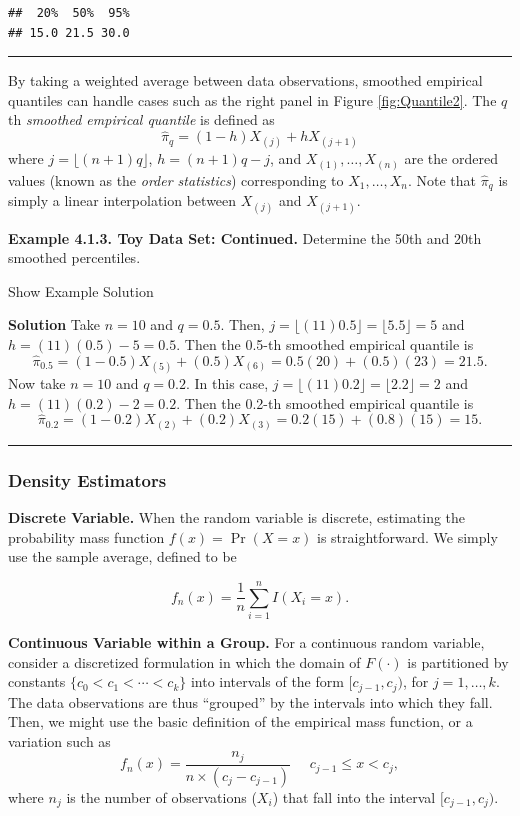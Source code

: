 \documentclass[]{book}
\theoremstyle{definition}
\theoremstyle{definition}
\theoremstyle{definition}
\theoremstyle{remark}
\begin{document}
\begin{verbatim}
##  20%  50%  95% 
## 15.0 21.5 30.0
\end{verbatim}

\begin{center}\rule{0.5\linewidth}{\linethickness}\end{center}

By taking a weighted average between data observations, smoothed
empirical quantiles can handle cases such as the right panel in Figure
\ref{fig:Quantile2}. The \(q\)th \emph{smoothed empirical quantile} is
defined as \[
\hat{\pi}_q = (1-h) X_{(j)} + h X_{(j+1)}
\] where \(j=\lfloor(n+1)q\rfloor\), \(h=(n+1)q-j\), and
\(X_{(1)}, \ldots, X_{(n)}\) are the ordered values (known as the
\emph{order statistics}) corresponding to \(X_1, \ldots, X_n\). Note
that \(\hat{\pi}_q\) is simply a linear interpolation between
\(X_{(j)}\) and \(X_{(j+1)}\).

\textbf{Example 4.1.3. Toy Data Set: Continued.} Determine the 50th and
20th smoothed percentiles.

Show Example Solution

\hypertarget{toggleExampleSelect.1.3}{}
\textbf{Solution} Take \(n=10\) and \(q=0.5\). Then,
\(j=\lfloor(11)0.5 \rfloor= \lfloor5.5 \rfloor=5\) and
\(h=(11)(0.5)-5=0.5\). Then the 0.5-th smoothed empirical quantile is
\[\hat{\pi}_{0.5} = (1-0.5) X_{(5)} + (0.5) X_{(6)} = 0.5 (20) + (0.5)(23) = 21.5.\]
Now take \(n=10\) and \(q=0.2\). In this case,
\(j=\lfloor(11)0.2\rfloor=\lfloor 2.2 \rfloor=2\) and
\(h=(11)(0.2)-2=0.2\). Then the 0.2-th smoothed empirical quantile is
\[\hat{\pi}_{0.2} = (1-0.2) X_{(2)} + (0.2) X_{(3)} = 0.2 (15) + (0.8)(15) = 15.\]

\begin{center}\rule{0.5\linewidth}{\linethickness}\end{center}

\subsubsection{Density Estimators}\label{density-estimators}

\textbf{Discrete Variable.} When the random variable is discrete,
estimating the probability mass function \(f(x) = \Pr(X=x)\) is
straightforward. We simply use the sample average, defined to be

\[f_n(x) = \frac{1}{n} \sum_{i=1}^n I(X_i = x).\]

\textbf{Continuous Variable within a Group.} For a continuous random
variable, consider a discretized formulation in which the domain of
\(F(\cdot)\) is partitioned by constants
\(\{c_0 < c_1 < \cdots < c_k\}\) into intervals of the form
\([c_{j-1}, c_j)\), for \(j=1, \ldots, k\). The data observations are
thus ``grouped'' by the intervals into which they fall. Then, we might
use the basic definition of the empirical mass function, or a variation
such as
\[f_n(x) = \frac{n_j}{n \times (c_j - c_{j-1})}  \ \ \ \ \ \ c_{j-1} \le x < c_j,\]
where \(n_j\) is the number of observations (\(X_i\)) that fall into the
interval \([c_{j-1}, c_j)\).
\end{document}
